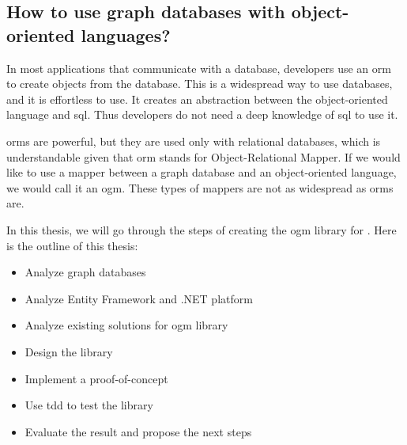 \begin{introduction}
    \section{How to use graph databases with object-oriented languages?}

    In most applications that communicate with a database, developers use an \acrshort{orm} to create objects from the database.
    This is a widespread way to use databases, and it is effortless to use. It creates an abstraction between the object-oriented language and \acrshort{sql}.
    Thus developers do not need a deep knowledge of \acrshort{sql} to use it.

    \acrshort{orm}s are powerful, but they are used only with relational databases, which is understandable given that \acrshort{orm} stands for Object-Relational Mapper.
    If we would like to use a mapper between a graph database and an object-oriented language, we would call it an \acrfull{ogm}. These types of mappers are not as widespread as \acrshort{orm}s are.

    In this thesis, we will go through the steps of creating the \acrshort{ogm} library for \CS.
    Here is the outline of this thesis:
    \begin{itemize}
        \item {Analyze graph databases}
        \item {Analyze Entity Framework and .NET platform}
        \item {Analyze existing solutions for \acrshort{ogm} library}
        \item {Design the library}
        \item {Implement a proof-of-concept}
        \item {Use \acrfull{tdd} to test the library}
        \item {Evaluate the result and propose the next steps}
    \end{itemize}

\end{introduction}
